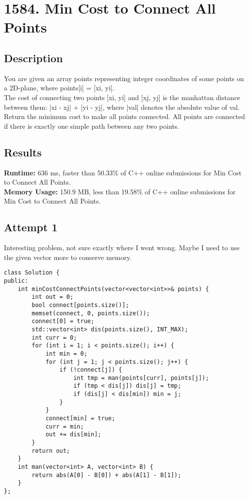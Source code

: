 \chapter{1584. Min Cost to Connect All Points}
\section{Description}
You are given an array points representing integer coordinates of some points on a 2D-plane, where points[i] = [xi, yi].
\\
The cost of connecting two points [xi, yi] and [xj, yj] is the manhattan distance between them: |xi - xj| + |yi - yj|, where |val| denotes the absolute value of val.
\\
Return the minimum cost to make all points connected. All points are connected if there is exactly one simple path between any two points.
\section{Results}
\textbf{Runtime:} 636 ms, faster than 50.33\% of C++ online submissions for Min Cost to Connect All Points.\\
\textbf{Memory Usage:} 150.9 MB, less than 19.58\% of C++ online submissions for Min Cost to Connect All Points.\\
\newpage
\section{Attempt 1}
Interesting problem, not sure exactly where I went wrong. Maybe I need to use the given vector more to conserve memory.
\begin{lstlisting}
class Solution {
public:
    int minCostConnectPoints(vector<vector<int>>& points) {
        int out = 0;
        bool connect[points.size()];
        memset(connect, 0, points.size());
        connect[0] = true;
        std::vector<int> dis(points.size(), INT_MAX);
        int curr = 0;
        for (int i = 1; i < points.size(); i++) {
            int min = 0;
            for (int j = 1; j < points.size(); j++) {
                if (!connect[j]) {
                    int tmp = man(points[curr], points[j]);
                    if (tmp < dis[j]) dis[j] = tmp;
                    if (dis[j] < dis[min]) min = j;
                }
            }
            connect[min] = true;
            curr = min;
            out += dis[min];
        }
        return out;
    }
    int man(vector<int> A, vector<int> B) {
        return abs(A[0] - B[0]) + abs(A[1] - B[1]);
    }
};
\end{lstlisting}
